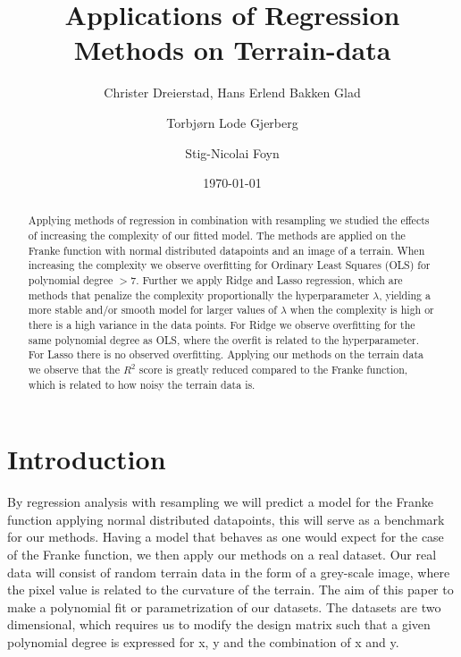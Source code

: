 \documentclass[%
 reprint,
nofootinbib,
 amsmath,amssymb,
 aps,
]{revtex4-2}
\begin{document}

\title{Applications of Regression Methods on Terrain-data}%

\author{Christer Dreierstad, Hans Erlend Bakken Glad}
\author{Torbjørn Lode Gjerberg}
\author{Stig-Nicolai Foyn}


\date{\today}

\begin{abstract}
Applying methods of regression in combination with resampling we studied the effects of increasing the complexity of our fitted model. The methods are applied on the Franke function with normal distributed datapoints and an image of a terrain. When increasing the complexity we observe overfitting for Ordinary Least Squares (OLS) for polynomial degree $>7$. Further we apply Ridge and Lasso regression, which are methods that penalize the complexity proportionally the hyperparameter $\lambda$, yielding a more stable and/or smooth model for larger values of $\lambda$ when the complexity is high or there is a high variance in the data points. For Ridge we observe overfitting for the same polynomial degree as OLS, where the overfit is related to the hyperparameter. For Lasso there is no observed overfitting. Applying our methods on the terrain data we observe that the $R^2$ score is greatly reduced compared to the Franke function, which is related to how noisy the terrain data is.
\end{abstract}

\maketitle



\section{Introduction\label{sec:intro}}
By regression analysis with resampling we will predict a model for the Franke function applying normal distributed datapoints, this will serve as a benchmark for our methods. Having a model that behaves as one would expect for the case of the Franke function, we then apply our methods on a real dataset. Our real data will consist of random terrain data in the form of a grey-scale image, where the pixel value is related to the curvature of the terrain. The aim of this paper to make a polynomial fit or parametrization of our datasets. The datasets are two dimensional, which requires us to modify the design matrix such that a given polynomial degree is expressed for x, y and the combination of x and y.
\end{document}
